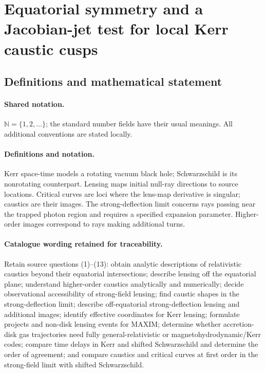 \documentclass[11pt]{article}
\begin{document}
\section{Equatorial symmetry and a Jacobian-jet test for local Kerr caustic cusps}\label{statement}

\subsection{Definitions and mathematical statement}

\paragraph{Shared notation.}$\mathbb N=\{1,2,\ldots\}$; the standard number fields have their usual meanings. All additional conventions are stated locally.


\paragraph{Definitions and notation.}Kerr space-time models a rotating vacuum black hole; Schwarzschild is its nonrotating counterpart. Lensing maps initial null-ray directions to source locations. Critical curves are loci where the lens-map derivative is singular; caustics are their images. The strong-deflection limit concerns rays passing near the trapped photon region and requires a specified expansion parameter. Higher-order images correspond to rays making additional turns.

\paragraph{Catalogue wording retained for traceability.}
Retain source questions (1)--(13): obtain analytic descriptions of relativistic caustics beyond their equatorial intersections; describe lensing off the equatorial plane; understand higher-order caustics analytically and numerically; decide observational accessibility of strong-field lensing; find caustic shapes in the strong-deflection limit; describe off-equatorial strong-deflection lensing and additional images; identify effective coordinates for Kerr lensing; formulate projects and non-disk lensing events for MAXIM; determine whether accretion-disk gas trajectories need fully general-relativistic or magnetohydrodynamic/Kerr codes; compare time delays in Kerr and shifted Schwarzschild and determine the order of agreement; and compare caustics and critical curves at first order in the strong-field limit with shifted Schwarzschild.
\end{document}
